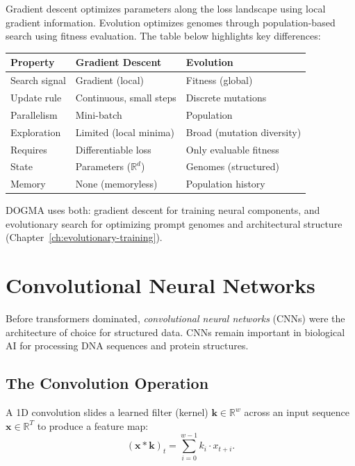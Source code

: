 \begin{bioinsight}
Gradient descent optimizes parameters along the loss landscape using local gradient information. Evolution optimizes genomes through population-based search using fitness evaluation. The table below highlights key differences:
\begin{center}
\renewcommand{\arraystretch}{1.12}
\begin{tabularx}{0.85\textwidth}{L{3cm} L{3.5cm} Y}
\toprule
\textbf{Property} & \textbf{Gradient Descent} & \textbf{Evolution} \\
\midrule
Search signal & Gradient (local) & Fitness (global) \\
Update rule & Continuous, small steps & Discrete mutations \\
Parallelism & Mini-batch & Population \\
Exploration & Limited (local minima) & Broad (mutation diversity) \\
Requires & Differentiable loss & Only evaluable fitness \\
State & Parameters ($\mathbb{R}^d$) & Genomes (structured) \\
Memory & None (memoryless) & Population history \\
\bottomrule
\end{tabularx}
\end{center}
DOGMA uses both: gradient descent for training neural components, and evolutionary search for optimizing prompt genomes and architectural structure (Chapter~\ref{ch:evolutionary-training}).
\end{bioinsight}

\section{Convolutional Neural Networks}
\label{sec:cnns}

Before transformers dominated, \emph{convolutional neural networks} (CNNs) were the architecture of choice for structured data. CNNs remain important in biological AI for processing DNA sequences and protein structures.

\subsection{The Convolution Operation}

A 1D convolution slides a learned filter (kernel) $\mathbf{k} \in \mathbb{R}^w$ across an input sequence $\mathbf{x} \in \mathbb{R}^T$ to produce a feature map:
\begin{equation}
(\mathbf{x} * \mathbf{k})_t = \sum_{i=0}^{w-1} k_i \cdot x_{t+i}.
\end{equation}

